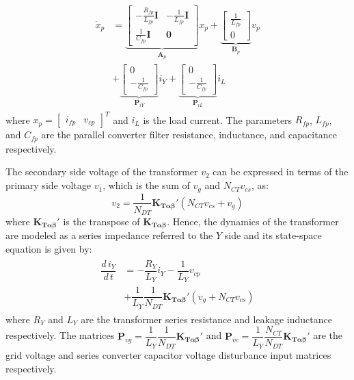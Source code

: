\begin{align}
    \begin{aligned}
        \dot{x}_p &=
        \underbrace{
        \begin{bmatrix}
            -\frac{R_{fp}}{L_{fp}} \mathbf{I} & -\frac{1}{L_{fp}} \mathbf{I}\\
            \frac{1}{C_{fp}} \mathbf{I} & \mathbf{0}
        \end{bmatrix}
        }_{\mathbf{A}_p}
        x_p +
        \underbrace{
        \begin{bmatrix}
            \frac{1}{L_{fp}}\\
            0
        \end{bmatrix}
        }_{\mathbf{B}_p}
        v_p\\
        &+
        \underbrace{
        \begin{bmatrix}
            0\\
            -\frac{1}{C_{fp}}
        \end{bmatrix}
        }_{\mathbf{P}_{iY}}
        i_Y
        +
        \underbrace{
        \begin{bmatrix}
            0\\
            -\frac{1}{C_{fp}}
        \end{bmatrix}
        }_{\mathbf{P}_{iL}}
        i_L \label{eq:ParallelConverter_Dynamics}
    \end{aligned}
\end{align}
where $x_p = \begin{bmatrix} i_{fp} & v_{cp} \end{bmatrix}^T$ and $i_L$ is the load current. The parameters $R_{fp}$, $L_{fp}$, and $C_{fp}$ are the parallel converter filter resistance, inductance, and capacitance respectively.

The secondary side voltage of the transformer $v_2$ can be expressed in terms of the primary side voltage $v_1$, which is the sum of $v_g$ and $N_{CT} v_{cs}$, as:
\begin{equation}
    v_2 = \dfrac{1}{N_{DT}} \mathbf{K_{T\alpha\beta}}'(N_{CT}v_{cs} + v_g)
\end{equation}
where $\mathbf{K_{T\alpha\beta}}'$ is the transpose of $\mathbf{K_{T\alpha\beta}}$. Hence, the dynamics of the transformer are modeled as a series impedance referred to the $Y$ side and its state-space equation is given by:
\begin{align}
    \begin{aligned}
        \dfrac{d\,i_Y}{d\,t} &= -\dfrac{R_Y}{L_Y}i_Y - \dfrac{1}{L_Y}v_{cp}\\
        &+ \dfrac{1}{L_Y}\dfrac{1}{N_{DT}} \mathbf{K_{T\alpha\beta}}' (v_g + N_{CT}v_{cs}) \label{eq:Transformer_Dynamics}
    \end{aligned}
\end{align}
where $R_Y$ and $L_Y$ are the transformer series resistance and leakage inductance respectively. The matrices $\mathbf{P}_{vg} = \dfrac{1}{L_Y}\dfrac{1}{N_{DT}} \mathbf{K_{T\alpha\beta}}'$ and $\mathbf{P}_{vc} = \dfrac{1}{L_Y}\dfrac{N_{CT}}{N_{DT}} \mathbf{K_{T\alpha\beta}}'$ are the grid voltage and series converter capacitor voltage disturbance input matrices respectively.

